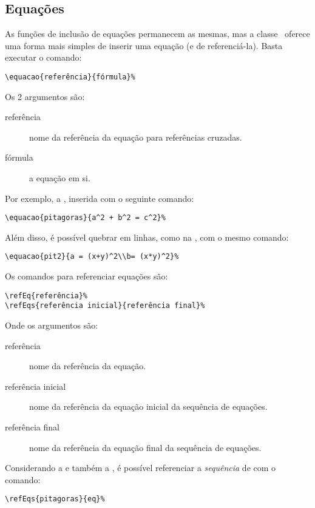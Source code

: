 \subsection{Equações}
As funções de inclusão de equações permanecem as mesmas, mas a classe \unbcic\
oferece uma forma mais simples de inserir uma equação (e de referenciá-la). Basta
executar o comando:

\begin{verbatim}
\equacao{referência}{fórmula}%
\end{verbatim}

Os 2 argumentos são:
\begin{description}
\item[referência] nome da referência da equação para referências cruzadas.
\item[fórmula] a equação em si.
\end{description}

Por exemplo, a , inserida com o seguinte comando:
\begin{verbatim}
\equacao{pitagoras}{a^2 + b^2 = c^2}%
\end{verbatim}

%

Além disso, é possível quebrar em linhas, como na , com o mesmo comando:
\begin{verbatim}
\equacao{pit2}{a = (x+y)^2\\b= (x*y)^2}%
\end{verbatim}

%

Os comandos para referenciar equações são:

\begin{verbatim}
\refEq{referência}%
\refEqs{referência inicial}{referência final}%
\end{verbatim}

Onde os argumentos são:
\begin{description}
\item[referência] nome da referência da equação.
\item[referência inicial] nome da referência da equação inicial da sequência de equações.
\item[referência final] nome da referência da equação final da sequência de equações.
\end{description}

Considerando a  e também a , é possível referenciar
a \emph{sequência} de \refEqs{pitagoras}{eq} com o comando:
\begin{verbatim}
\refEqs{pitagoras}{eq}%
\end{verbatim}


